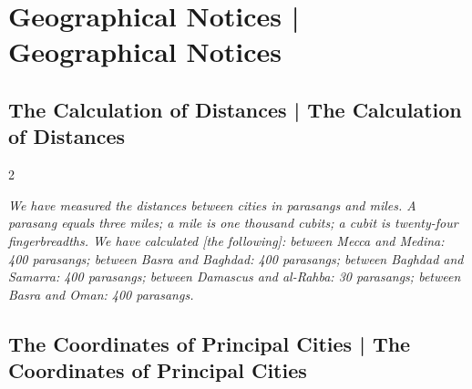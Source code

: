 \documentclass[11pt,a4paper]{article}
\begin{document}
\clearpage


\section{Geographical Notices | Geographical Notices}

\subsection{The Calculation of Distances | The Calculation of Distances}

\begin{paracol}{2}

\switchcolumn[0]
\begin{flushright}
{\small\arabicfont
{}}
\end{flushright}

\switchcolumn[1]
\begin{flushleft}
\small
\textit{We have measured the distances between cities in parasangs and miles. A parasang equals three miles; a mile is one thousand cubits; a cubit is twenty-four fingerbreadths. We have calculated [the following]: between Mecca and Medina: 400 parasangs; between Basra and Baghdad: 400 parasangs; between Baghdad and Samarra: 400 parasangs; between Damascus and al-Rahba: 30 parasangs; between Basra and Oman: 400 parasangs.}
\end{flushleft}

\end{paracol}

\vspace{0.3cm}

\subsection{The Coordinates of Principal Cities | The Coordinates of Principal Cities}
\end{document}
